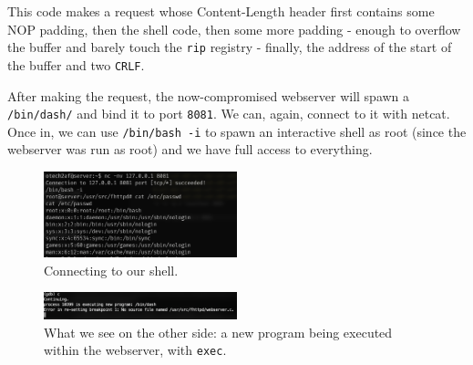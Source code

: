 \documentclass[a4paper,11pt,hidelinks]{article}
\begin{document}
This code makes a request whose Content-Length header first contains some NOP padding, then the shell code, then some more padding - enough to overflow the buffer and barely touch the \verb=rip= registry - finally, the address of the start of the buffer and two \verb=CRLF=.

After making the request, the now-compromised webserver will spawn a \verb=/bin/dash/= and bind it to port \verb=8081=. We can, again, connect to it with netcat. Once in, we can use \verb=/bin/bash -i= to spawn an interactive shell as root (since the webserver was run as root) and we have full access to everything.

\begin{figure}[h!]
  \centering
  \includegraphics[width=0.5\textwidth]{../drawable/connecting-to-bindshell.png}
  \caption{Connecting to our shell.}
\end{figure}

\begin{figure}[h!]
  \centering
  \includegraphics[width=0.5\textwidth]{../drawable/executing-new-program.png}
  \caption{What we see on the other side: a new program being executed within the webserver, with \texttt{exec}.}
\end{figure}

\endgroup
\end{document}
